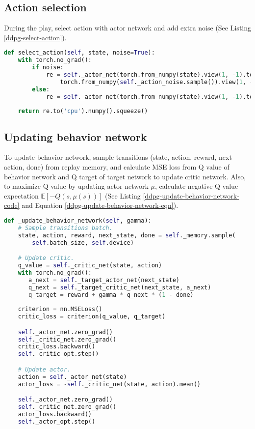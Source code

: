 \subsection{Action selection}
\indent
    During the play, select action with actor network and add extra noise (See Listing \ref{ddpg-select-action}).

\begin{lstlisting}[language=Python, caption={Python code of \textcolor{blue}{\textbf{select\_action}} of DDPG.}, label={ddpg-select-action}]
def select_action(self, state, noise=True):
    with torch.no_grad():
        if noise:
            re = self._actor_net(torch.from_numpy(state).view(1, -1).to(self.device)) + \
                torch.from_numpy(self._action_noise.sample()).view(1, -1).to(self.device)
        else:
            re = self._actor_net(torch.from_numpy(state).view(1, -1).to(self.device))
            
    return re.to('cpu').numpy().squeeze()\end{lstlisting}

\subsection{Updating behavior network}
\indent
    To update behavior network, sample transitions (state, action, reward, next action, done) from replay memory, and calculate MSE loss from Q value of behavior network and Q target of target network to update critic network. Also, to maximize Q value by updating actor network $\mu$, calculate negative Q value expectation $\mathbb{E}[- Q(s, \mu(s))]$ (See Listing \ref{ddpg-update-behavior-network-code} and Equation \ref{ddpg-update-behavior-network-eqn}).

\begin{lstlisting}[language=Python, caption={Python code of \textcolor{blue}{\textbf{\_update\_behavior\_network}} of DDPG.}, label={ddpg-update-behavior-network-code}]
def _update_behavior_network(self, gamma):
    # Sample transitions batch.
    state, action, reward, next_state, done = self._memory.sample(
        self.batch_size, self.device)

    # Update critic.
    q_value = self._critic_net(state, action)
    with torch.no_grad():
       a_next = self._target_actor_net(next_state)
       q_next = self._target_critic_net(next_state, a_next)
       q_target = reward + gamma * q_next * (1 - done)
       
    criterion = nn.MSELoss()
    critic_loss = criterion(q_value, q_target)

    self._actor_net.zero_grad()
    self._critic_net.zero_grad()
    critic_loss.backward()
    self._critic_opt.step()

    # Update actor.
    action = self._actor_net(state)
    actor_loss = -self._critic_net(state, action).mean()

    self._actor_net.zero_grad()
    self._critic_net.zero_grad()
    actor_loss.backward()
    self._actor_opt.step()\end{lstlisting}

